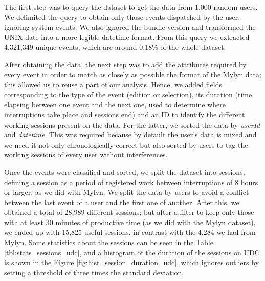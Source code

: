 \documentclass[times]{smrauth}
\begin{document}
The first step was to query the dataset to get the data from 1,000 random users. We delimited the query to obtain only those events dispatched by the user, ignoring system events. We also ignored the bundle version and transformed the UNIX date into a more legible datetime format. From this query we extracted 4,321,349 unique events, which are around $0.18\%$ of the whole dataset.

After obtaining the data, the next step was to add the attributes required by every event in order to match as closely as possible the format of the Mylyn data; this allowed us to reuse a part of our analysis. Hence, we added fields corresponding to the type of the event (edition or selection), its duration (time elapsing between one event and the next one, used to determine where interruptions take place and sessions end) and an ID to identify the different working sessions present on the data. For the latter, we sorted the data by \textit{userId} and \textit{datetime}. This was required because by default the user's data is mixed and we need it not only chronologically correct but also sorted by users to tag the working sessions of every user without interferences. 


Once the events were classified and sorted, we split the dataset into sessions, defining a session as a period of registered work between interruptions of 8 hours or larger, as we did with Mylyn. We split the data by users to avoid a conflict between the last event of a user and the first one of another. After this, we obtained a total of 28,989 different sessions; but after a filter to keep only those with at least 30 minutes of productive time (as we did with the Mylyn dataset), we ended up with 15,825 useful sessions, in contrast with the 4,284 we had from Mylyn. Some statistics about the sessions can be seen in the Table \ref{tbl:stats_sessions_udc}, and a histogram of the duration of the sessions on UDC is shown in the Figure \ref{fig:hist_session_duration_udc}, which ignores outliers by setting a threshold of three times the standard deviation.
\end{document}
